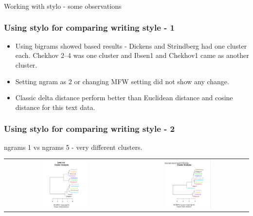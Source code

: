 \documentclass{beamer}
\begin{document}
\begin{frame}
\frametitle{}
\Large Working with stylo - some observations 
\end{frame}


\begin{frame}
\frametitle{Using stylo for comparing writing style - 1}
\begin{itemize}
\item Using bigrams showed based results - Dickens and Strindberg had one cluster each. Chekhov 2--4 was one cluster and Ibsen1 and Chekhov1 came as another cluster.
\item Setting ngram as 2 or changing MFW setting did not show any change. 
\item Classic delta distance perform better than Euclidean distance and cosine distance for this text data.
\end{itemize}
\end{frame}

\begin{frame}
\frametitle{Using stylo for comparing writing style - 2}
ngrams 1 vs ngrams 5 - very different clusters. 
\begin{tabular}{cc}
\includegraphics[width=0.4\textwidth]{spoth-100mfw.jpg} & \includegraphics[width=0.4\textwidth]{spoth-100mfw-5grams.jpg}\\
\end{tabular}
\end{frame}
\end{document}
